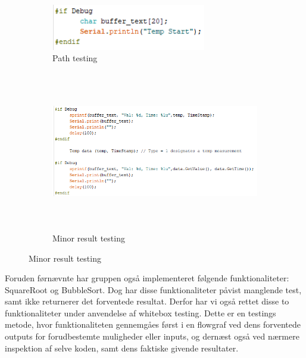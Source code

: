 \documentclass[11pt]{article}
\begin{document}
    \begin{figure}[H]
        \begin{subfigure}{0.3\textwidth}
            \centering
            \includegraphics[width=1\linewidth, height=2cm]{Struktureret_System_Udvikling/Workshop_3/Assets/Start.PNG}
            \caption{Path testing}
            \label{fig:TestPath}
        \end{subfigure}
        \begin{subfigure}{0.7\textwidth}
            \centering
            \includegraphics[width=1\linewidth, height=7cm]{Struktureret_System_Udvikling/Workshop_3/Assets/Secound.PNG}
            \caption{Minor result testing}
            \label{fig:TestRes}
        \end{subfigure}
        \label{fig:Testing}
    \end{figure}
    
    
    \noindent
    Foruden førnævnte har gruppen også implementeret følgende funktionaliteter:
    SquareRoot og BubbleSort.
    Dog har disse funktionaliteter påvist manglende test, samt ikke returnerer det forventede resultat. Derfor har vi også rettet disse to funktionaliteter under anvendelse af whitebox testing. Dette er en testings metode, hvor funktionaliteten gennemgåes først i en flowgraf ved dens forventede outputs for forudbestemte muligheder eller inputs, og dernæst også ved nærmere inspektion af selve koden, samt dens faktiske givende resultater.
    
\end{document}
